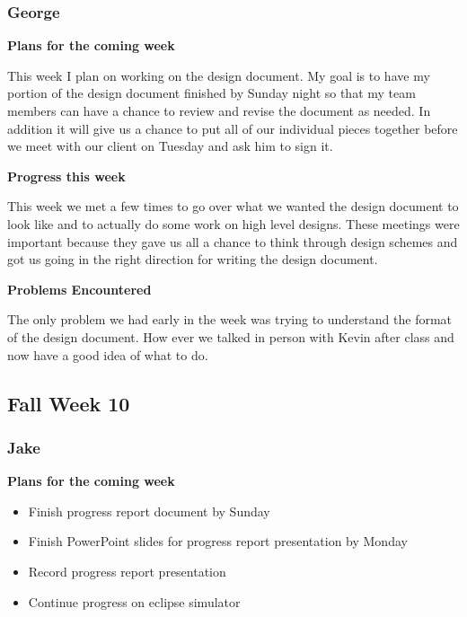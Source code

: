 \documentclass[10pt, onecolumn, draftclsnofoot, letterpaper, compsoc]{IEEEtran}
\begin{document}
    \subsubsection{George}

    \noindent \textbf{Plans for the coming week}

    This week I plan on working on the design document. My goal is to have my portion
    of the design document finished by Sunday night so that my team members can
    have a chance to review and revise the document as needed. In addition it will
    give us a chance to put all of our individual pieces together before we meet
    with our client on Tuesday and ask him to sign it.

    \noindent \textbf{Progress this week}

    This week we met a few times to go over what we wanted the design document to
    look like and to actually do some work on high level designs. These meetings
    were important because they gave us all a chance to think through design schemes
    and got us going in the right direction for writing the design document.

    \noindent \textbf{Problems Encountered}

    The only problem we had early in the week was trying to understand the format
    of the design document. How ever we talked in person with Kevin after class
    and now have a good idea of what to do.

\subsection{Fall Week 10}

    \subsubsection{Jake}

     \noindent \textbf{Plans for the coming week}

     \begin{itemize}

    \item Finish progress report document by Sunday
    \item Finish PowerPoint slides for progress report presentation by Monday
    \item Record progress report presentation
    \item Continue progress on eclipse simulator

    \end{itemize}
\end{document}
